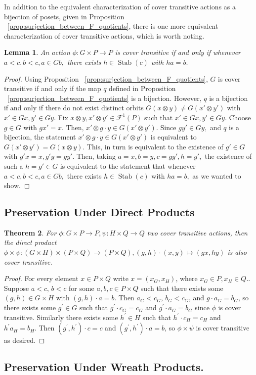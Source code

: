 \documentclass{amsart}
\newtheorem{thm}{Theorem}[subsection]
\newtheorem{lem}[thm]{Lemma}
\theoremstyle{remark}
\newcommand\ssec{\subsection}
\def\Stab{\operatorname{Stab}}
\begin{document}
In addition to the equivalent characterization of cover transitive actions as a bijection of posets, given in Proposition ~\ref{prop:surjection_between_F_quotients}, there is one more equivalent characterization of cover transitive actions, which is worth noting.

\begin{lem}
\label{lem:upper_cover_transitive}
An action $\phi:G\times P \rightarrow P$ is cover transitive if and only if whenever $a<c,b<c, a \in Gb,$ there exists $h \in \Stab(c)$ with $ha = b.$
\end{lem}
\begin{proof}
Using Proposition ~\ref{prop:surjection_between_F_quotients}, $G$ is cover transitive if and only if the map $q$ defined in Proposition ~\ref{prop:surjection_between_F_quotients} is a bijection. However, $q$ is a bijection if and only if there do not exist distinct orbits $G(x\otimes y) \neq G(x'\otimes y')$ with $x' \in Gx,y'\in Gy.$ Fix $x \otimes y,x'\otimes y' \in \mathcal F^1(P)$ such that $x' \in Gx,y'\in Gy$. Choose $g \in G$ with $gx' = x.$ Then, $x' \otimes g\cdot y \in G(x'\otimes y').$ Since $g y' \in Gy,$ and $q$ is a bijection, the statement $x' \otimes g\cdot y \in G(x'\otimes y')$ is equivalent to $G(x'\otimes y') = G(x\otimes y).$ This, in turn is equivalent to the existence of $g' \in G$ with $g'x = x,g'y = gy'.$ Then, taking $a = x,b = y,c = gy',h = g',$ the existence of such a $h=g'\in G$ is equivalent to the statement that whenever $a<c,b<c, a \in Gb,$ there exists $h \in \Stab(c)$ with $ha = b,$ as we wanted to show.
\end{proof}


\ssec{Preservation Under Direct Products}
\label{ssec:direct_product_preservation}

\begin{thm}
\label{thm:direct_product_preservation}
For $\phi:G\times P\rightarrow P,\psi:H \times Q \rightarrow Q$ two cover transitive actions, then the direct product $\phi \times \psi:(G\times H)\times (P\times Q) \rightarrow (P\times Q),(g,h)\cdot (x,y) \mapsto (gx,hy)$ is also cover transitive.
\end{thm}
\begin{proof}
For every element $x\in P\times Q$ write $x = (x_G,x_H)$, where $x_G \in P, x_H \in Q.$. Suppose $a < c$, $b < c$ for some $a,b,c\in P\times Q$ such that there exists some $(g,h)\in G\times H$ with $(g,h)\cdot a = b$. Then $a_G < c_G$, $b_G < c_G$, and $g\cdot a_G = b_G$, so there exists some $g^\prime \in G$ such that $g^\prime\cdot c_G = c_G$ and $g^\prime\cdot a_G = b_G$ since $\phi$ is cover transitive.  Similarly there exists some $h^\prime \in H$ such that $h^\prime \cdot c_H = c_H$ and $h^\prime a_H = b_H$.  Then $(g^\prime,h^\prime)\cdot c = c$ and $(g^\prime,h^\prime)\cdot a = b$, so $\phi\times \psi$ is cover transitive as desired.
\end{proof}
\ssec{Preservation Under Wreath Products.}
\label{ssec:wreath_preservation}
\end{document}
